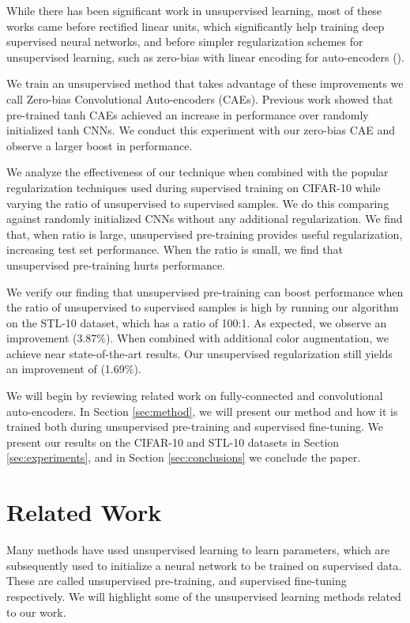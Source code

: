 \documentclass{article} \usepackage{iclr2015,times}
\begin{document}
While there has been significant work in unsupervised learning, most of these works came before rectified linear units, which significantly help training deep supervised neural networks, and before simpler regularization schemes for unsupervised learning, such as zero-bias with linear encoding for auto-encoders (\citet{memisevic2014zero}).

We train an unsupervised method that takes advantage of these improvements we call Zero-bias Convolutional Auto-encoders (CAEs). Previous work showed that pre-trained tanh CAEs achieved an increase in performance over randomly initialized tanh CNNs. We conduct this experiment with our zero-bias CAE and observe a larger boost in performance. 

We analyze the effectiveness of our technique when combined with the popular regularization techniques used during supervised training on CIFAR-10 while varying the ratio of unsupervised to supervised samples. We do this comparing against randomly initialized CNNs without any additional regularization. We find that, when ratio is large, unsupervised pre-training provides useful regularization, increasing test set performance. When the ratio is small, we find that unsupervised pre-training hurts performance. 

We verify our finding that unsupervised pre-training can boost performance when the ratio of unsupervised to supervised samples is high by running our algorithm on the STL-10 dataset, which has a ratio of 100:1. As expected, we observe an improvement (3.87\%). When combined with additional color augmentation, we achieve near state-of-the-art results. Our unsupervised regularization still yields an improvement of (1.69\%).

We will begin by reviewing related work on fully-connected and convolutional auto-encoders. In Section \ref{sec:method}, we will present our method and how it is trained both during unsupervised pre-training and supervised fine-tuning. We present our results on the CIFAR-10 and STL-10 datasets in Section \ref{sec:experiments}, and in Section \ref{sec:conclusions} we conclude the paper.



%
 
\section{Related Work}
\label{sec:related_work}
Many methods have used unsupervised learning to learn parameters, which are subsequently used to initialize a neural network to be trained on supervised data. These are called unsupervised pre-training, and supervised fine-tuning respectively. We will highlight some of the unsupervised learning methods related to our work.
\end{document}

